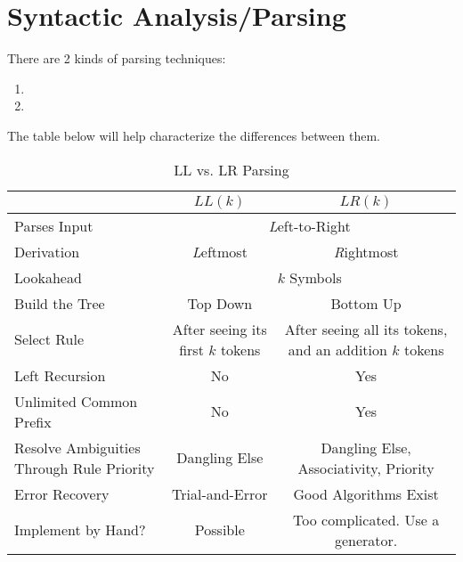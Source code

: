 \section{Syntactic Analysis/Parsing}\label{sec:SyntacticAnalysis}
There are 2 kinds of parsing techniques:
\begin{enumerate}[noitemsep]
\item {}
\item {}
\end{enumerate}

The table below will help characterize the differences between them.
\begin{table}[h!]
  \centering
  \begin{tabular}{p{4cm}cc}
    \toprule
    & $LL(k)$ & $LR(k)$ \\
    \midrule
    Parses Input & \multicolumn{2}{c}{\emph{L}eft-to-Right} \\ \midrule
    Derivation & \emph{L}eftmost & \emph{R}ightmost \\ \midrule
    Lookahead & \multicolumn{2}{c}{$k$ Symbols} \\ \midrule
    Build the Tree & Top Down & Bottom Up \\ \midrule
    Select Rule & After seeing its first $k$ tokens & After seeing all its tokens, and an addition $k$ tokens \\ \midrule
    Left Recursion & No & Yes \\ \midrule
    Unlimited Common Prefix & No & Yes \\ \midrule
    Resolve Ambiguities Through Rule Priority & Dangling Else & Dangling Else, Associativity, Priority \\ \midrule
    Error Recovery & Trial-and-Error & Good Algorithms Exist \\ \midrule
    Implement by Hand? & Possible & Too complicated. Use a generator. \\
    \bottomrule
  \end{tabular}
  \caption{LL vs. LR Parsing}
  \label{tab:LLvsLRParsing}
\end{table}

